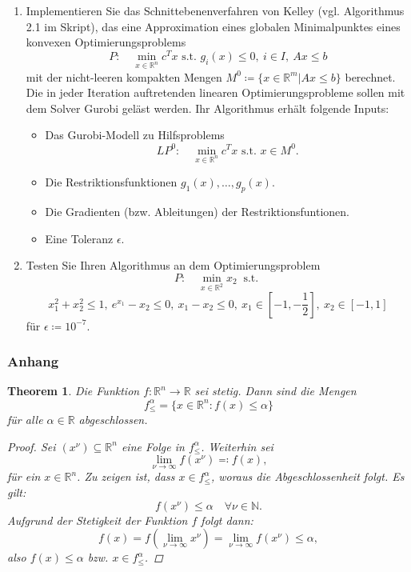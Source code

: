 \documentclass[12pt]{extreport} %
\newcommand{\N}{\mathbb{N}}
\newcommand{\R}{\mathbb{R}}
\theoremstyle{named}
\theoremstyle{nnamed}
\theoremstyle{itshape}
\theoremstyle{normal}
\newtheorem*{theorem}{Theorem}
\begin{document}
\begin{enumerate}
	\item Implementieren Sie das Schnittebenenverfahren von Kelley (vgl. Algorithmus 2.1 im Skript), das eine Approximation eines globalen Minimalpunktes eines konvexen Optimierungsproblems
		$$ P: \quad \min_{x \in \R^n} c^T x \text{ s.t. } g_i(x) \leq 0, ~ i \in I, ~Ax \leq b $$
		mit der nicht-leeren kompakten Mengen $M	^0 \coloneqq \{ x \in \R^m | Ax \leq b \}$ berechnet. Die in jeder Iteration auftretenden linearen Optimierungsprobleme sollen mit dem Solver Gurobi geläst werden. Ihr Algorithmus erhält folgende Inputs:
		\begin{itemize}
			\item Das Gurobi-Modell zu Hilfsproblems
				$$ LP^0: \quad \min_{x \in \R^n} c^T x \text{ s.t. } x \in M^0. $$
			\item Die Restriktionsfunktionen $g_1(x), \dotsc, g_p(x)$.
			\item Die Gradienten (bzw. Ableitungen) der Restriktionsfuntionen.
			\item Eine Toleranz $\epsilon$.
		\end{itemize}
	\item Testen Sie Ihren Algorithmus an dem Optimierungsproblem
		$$ P: \quad \min_{x \in \R^2} x_2 ~ \text{ s.t. } $$
		$$ x_1^2 + x_2^2 \leq 1, ~e^{x_1} - x_2 \leq 0, ~x_1 - x_2 \leq 0, ~ x_1 \in [-1, -\frac{1}{2}], ~ x_2 \in [-1, 1] $$
		für $\epsilon \coloneqq 10^{-7}$.
\end{enumerate} 

\newpage

\subsubsection{Anhang}
 

\begin{theorem}
 	 Die Funktion $f \colon \R^n \rightarrow \R$ sei stetig. Dann sind die Mengen 
 	 	$$ f^\alpha_\leq = \{ x \in \R^n \colon f(x) \leq \alpha\} $$
 	 für alle $\alpha \in \R$ abgeschlossen.
 	 
	\begin{proof}
 		Sei $(x^\nu) \subseteq \R^n$ eine Folge in $f_\leq^\alpha$. Weiterhin sei
 			$$ \lim_{\nu \rightarrow \infty} f(x^\nu) \eqqcolon f(x), $$
 			für ein $x \in \R^n$. Zu zeigen ist, dass $x \in f_\leq^\alpha$, woraus die Abgeschlossenheit folgt. Es gilt:
 			$$ f(x^\nu) \leq \alpha \quad \forall \nu \in \N. $$
 		Aufgrund der Stetigkeit der Funktion $f$ folgt dann:
 			$$ f(x) = f(\lim_{\nu \rightarrow \infty} x^\nu) = \lim_{\nu \rightarrow \infty} f(x^\nu) \leq \alpha, $$
 		also $f(x)  \leq \alpha$ bzw. $x \in f_\leq^\alpha$.
	\end{proof}
\end{theorem}

 
 
 
\end{document}
